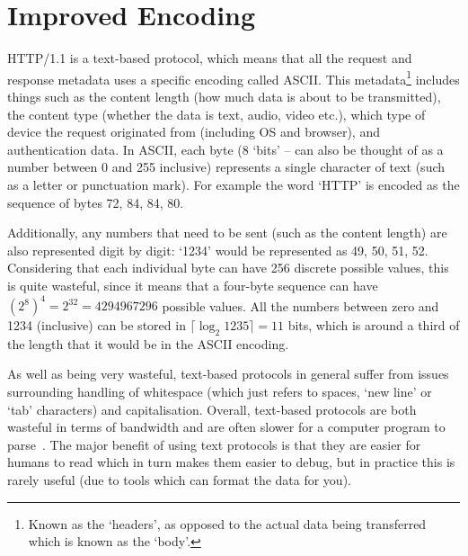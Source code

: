 \section{Improved Encoding}

HTTP/1.1 is a text\hyp{}based protocol, which means that all the request and response metadata uses a specific encoding called ASCII\@. This metadata\footnote{Known as the `headers', as opposed to the actual data being transferred which is known as the `body'.} includes things such as the content length (how much data is about to be transmitted), the content type (whether the data is text, audio, video etc.), which type of device the request originated from (including OS and browser), and authentication data. In ASCII, each byte (8 `bits' -- can also be thought of as a number between 0 and 255 inclusive) represents a single character of text (such as a letter or punctuation mark). For example the word `HTTP' is encoded as the sequence of bytes 72, 84, 84, 80.

Additionally, any numbers that need to be sent (such as the content length) are also represented digit by digit: `1234' would be represented as 49, 50, 51, 52. Considering that each individual byte can have 256 discrete possible values, this is quite wasteful, since it means that a four\hyp{}byte sequence can have $ (2^8)^4 = 2^{32} = 4294967296 $ possible values. All the numbers between zero and 1234 (inclusive) can be stored in $ \lceil \log_{2} 1235 \rceil = 11 $ bits, which is around a third of the length that it would be in the ASCII encoding.

As well as being very wasteful, text\hyp{}based protocols in general suffer from issues surrounding handling of whitespace (which just refers to spaces, `new line' or `tab' characters) and capitalisation. Overall, text-based protocols are both wasteful in terms of bandwidth and are often slower for a computer program to parse~\cite{http2faqbinary}. The major benefit of using text protocols is that they are easier for humans to read which in turn makes them easier to debug, but in practice this is rarely useful (due to tools which can format the data for you).

